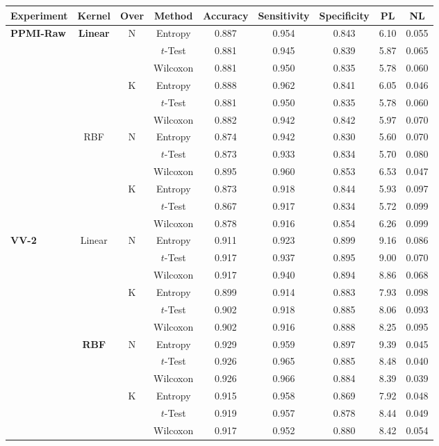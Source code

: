 	\begin{table}[ht]
		\centering
		\begin{tabular}{lcccccccc}
			Experiment 		& Kernel & Over & Method 	& Accuracy	& Sensitivity	& Specificity	& PL	& NL \\
			\hline \hline
			\multirow{12}{*}{\textbf{PPMI-Raw}} & \multirow{6}{*}{\textbf{Linear}} & \multirow{3}{*}{N}	& Entropy	& 0.887	& 0.954	& 0.843	& 6.10	& 0.055 \\ %
			&	&	& $t$-Test	& 0.881	& 0.945	& 0.839	& 5.87	& 0.065 \\ %
			&	&	& Wilcoxon	& 0.881	& 0.950	& 0.835	& 5.78	& 0.060 \\ %
			\cline{3-9}
			& & \multirow{3}{*}{K}	& Entropy	& 0.888	& 0.962	& 0.841	& 6.05	& 0.046 \\ %
			&	&	& $t$-Test	& 0.881	& 0.950	& 0.835	& 5.78	& 0.060 \\ %
			&	&	& Wilcoxon	& 0.882	& 0.942	& 0.842	& 5.97	& 0.070 \\ %
			\cline{2-9}
			& \multirow{6}{*}{RBF} & \multirow{3}{*}{N}	& Entropy	& 0.874	& 0.942	& 0.830	& 5.60	& 0.070 \\ %
			&	&	& $t$-Test	& 0.873	& 0.933	& 0.834	& 5.70	& 0.080 \\ %
			&	&	& Wilcoxon	& 0.895	& 0.960	& 0.853	& 6.53	& 0.047 \\ %
			\cline{3-9}
			& & \multirow{3}{*}{K}	& Entropy	& 0.873	& 0.918	& 0.844	& 5.93	& 0.097 \\ %
			&	&	& $t$-Test	& 0.867	& 0.917	& 0.834	& 5.72	& 0.099 \\ %
			&	&	& Wilcoxon	& 0.878	& 0.916	& 0.854	& 6.26	& 0.099 \\ %
			\hline
			\multirow{12}{*}{\textbf{VV-2}} & \multirow{6}{*}{Linear} & \multirow{3}{*}{N}	& Entropy	& 0.911	& 0.923	& 0.899	& 9.16	& 0.086 \\ %
			&	&	& $t$-Test	& 0.917	& 0.937	& 0.895	& 9.00	& 0.070 \\ %
			&	&	& Wilcoxon	& 0.917	& 0.940	& 0.894	& 8.86	& 0.068 \\ %
			\cline{3-9}
			& & \multirow{3}{*}{K}	& Entropy	& 0.899	& 0.914	& 0.883	& 7.93	& 0.098 \\ %
			&	&	& $t$-Test	& 0.902	& 0.918	& 0.885	& 8.06	& 0.093 \\ %
			&	&	& Wilcoxon	& 0.902	& 0.916	& 0.888	& 8.25	& 0.095 \\ %
			\cline{2-9}
			& \multirow{6}{*}{\textbf{RBF}}	& \multirow{3}{*}{N}	& Entropy	& 0.929	& 0.959	& 0.897	& 9.39	& 0.045 \\ %
			&	&	& $t$-Test	& 0.926	& 0.965	& 0.885	& 8.48	& 0.040 \\ %
			&	&	& Wilcoxon	& 0.926	& 0.966	& 0.884	& 8.39	& 0.039 \\ %
			\cline{3-9}
			& & \multirow{3}{*}{K}	& Entropy	& 0.915	& 0.958	& 0.869	& 7.92	& 0.048 \\ %
			&	&	& $t$-Test	& 0.919	& 0.957	& 0.878	& 8.44	& 0.049 \\ %
			&	&	& Wilcoxon	& 0.917	& 0.952	& 0.880	& 8.42	& 0.054 \\ %
			

\end{tabular}
\end{table}
